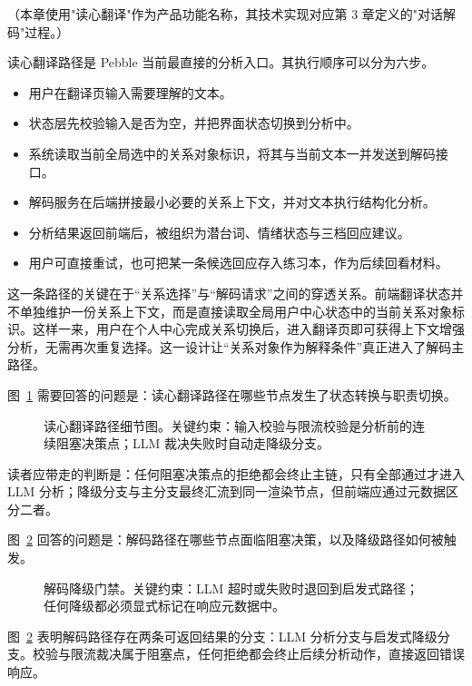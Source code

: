 （本章使用"读心翻译"作为产品功能名称，其技术实现对应第 3 章定义的"对话解码"过程。）

读心翻译路径是 Pebble 当前最直接的分析入口。其执行顺序可以分为六步。

\begin{itemize}
  \item 用户在翻译页输入需要理解的文本。
  \item 状态层先校验输入是否为空，并把界面状态切换到分析中。
  \item 系统读取当前全局选中的关系对象标识，将其与当前文本一并发送到解码接口。
  \item 解码服务在后端拼接最小必要的关系上下文，并对文本执行结构化分析。
  \item 分析结果返回前端后，被组织为潜台词、情绪状态与三档回应建议。
  \item 用户可直接重试，也可把某一条候选回应存入练习本，作为后续回看材料。
\end{itemize}

这一条路径的关键在于“关系选择”与“解码请求”之间的穿透关系。前端翻译状态并不单独维护一份关系上下文，而是直接读取全局用户中心状态中的当前关系对象标识。这样一来，用户在个人中心完成关系切换后，进入翻译页即可获得上下文增强分析，无需再次重复选择。这一设计让“关系对象作为解释条件”真正进入了解码主路径。

图~\ref{fig:pebble-translate-path-detail} 需要回答的问题是：读心翻译路径在哪些节点发生了状态转换与职责切换。

\begin{figure}[H]
  \centering
  
  \caption{读心翻译路径细节图。关键约束：输入校验与限流校验是分析前的连续阻塞决策点；LLM 裁决失败时自动走降级分支。}
  \label{fig:pebble-translate-path-detail}
\end{figure}

读者应带走的判断是：任何阻塞决策点的拒绝都会终止主链，只有全部通过才进入 LLM 分析；降级分支与主分支最终汇流到同一渲染节点，但前端应通过元数据区分二者。

图~\ref{fig:pebble-decode-gate} 回答的问题是：解码路径在哪些节点面临阻塞决策，以及降级路径如何被触发。

\begin{figure}[H]
  \centering
  
  \caption{解码降级门禁。关键约束：LLM 超时或失败时退回到启发式路径；任何降级都必须显式标记在响应元数据中。}
  \label{fig:pebble-decode-gate}
\end{figure}

图~\ref{fig:pebble-decode-gate} 表明解码路径存在两条可返回结果的分支：LLM 分析分支与启发式降级分支。校验与限流裁决属于阻塞点，任何拒绝都会终止后续分析动作，直接返回错误响应。

